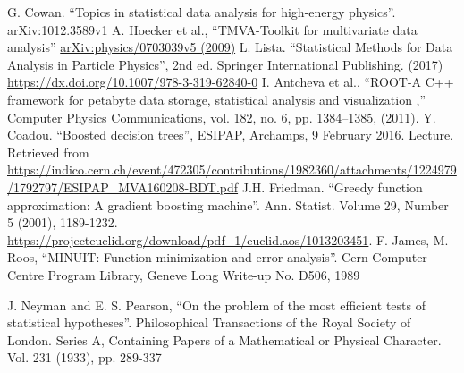 \documentclass[print]{nuthesis}
\begin{document}
\begin{thebibliography}{300}

 G. Cowan. ``Topics in statistical data analysis for high-energy physics''. arXiv:1012.3589v1
  A. Hoecker et al., ``TMVA-Toolkit for multivariate data analysis'' \href{https://arxiv.org/pdf/physics/0703039.pdf}{arXiv:physics/0703039v5 (2009)} 
 L. Lista. ``Statistical Methods for Data Analysis in Particle Physics'', 2nd ed. Springer International Publishing. (2017) \url{https://dx.doi.org/10.1007/978-3-319-62840-0}
 I. Antcheva et al., ``ROOT-A C++ framework for petabyte data storage, statistical analysis and visualization ,'' Computer Physics Communications, vol. 182, no. 6, pp. 1384–1385, (2011).
 Y. Coadou. ``Boosted decision trees'', ESIPAP, Archamps, 9 February 2016. Lecture. Retrieved from \url{https://indico.cern.ch/event/472305/contributions/1982360/attachments/1224979/1792797/ESIPAP_MVA160208-BDT.pdf}
 J.H. Friedman. ``Greedy function approximation: A gradient boosting machine''. Ann. Statist. Volume 29, Number 5 (2001), 1189-1232. \url{https://projecteuclid.org/download/pdf_1/euclid.aos/1013203451}.
  F. James, M. Roos, ``MINUIT: Function minimization and error analysis''. Cern Computer Centre Program Library, Geneve Long Write-up No. D506, 1989

  
  

J. Neyman and E. S. Pearson, ``On the problem of the most efficient tests of statistical hypotheses''. Philosophical Transactions of the Royal Society of London. Series A, Containing Papers of a Mathematical or Physical Character. Vol. 231 (1933), pp. 289-337


\end{thebibliography}
\end{document}
